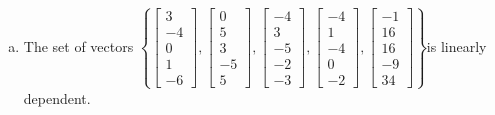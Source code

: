 \begin{exerciseAnswer}
\begin{enumerate}[(a)]
\item  The set of vectors \( \left\{ \left[\begin{array}{c}
3 \\
-4 \\
0 \\
1 \\
-6
\end{array}\right] , \left[\begin{array}{c}
0 \\
5 \\
3 \\
-5 \\
5
\end{array}\right] , \left[\begin{array}{c}
-4 \\
3 \\
-5 \\
-2 \\
-3
\end{array}\right] , \left[\begin{array}{c}
-4 \\
1 \\
-4 \\
0 \\
-2
\end{array}\right] , \left[\begin{array}{c}
-1 \\
16 \\
16 \\
-9 \\
34
\end{array}\right] \right\} \)is linearly dependent.
\end{enumerate}
    
\end{exerciseAnswer}
    
